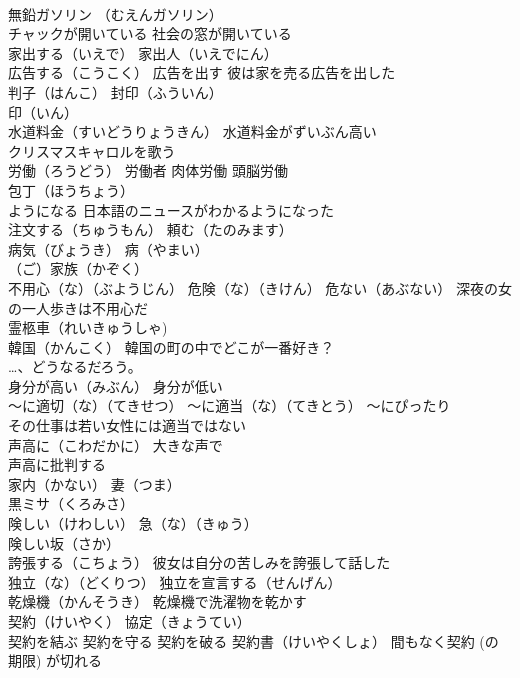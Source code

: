 \documentclass[8pt]{extreport}
\begin{document}
\begin{CJK}{UTF8}{min}
\\	無鉛ガソリン （むえんガソリン）
\\	チャックが開いている 社会の窓が開いている 
\\	家出する（いえで） 家出人（いえでにん）
\\	広告する（こうこく） 広告を出す 彼は家を売る広告を出した
\\	判子（はんこ） 封印（ふういん） 
\\	印（いん） 
\\	水道料金（すいどうりょうきん） 水道料金がずいぶん高い
\\	クリスマスキャロルを歌う
\\	労働（ろうどう） 労働者 肉体労働 頭脳労働
\\	包丁（ほうちょう）
\\	ようになる 日本語のニュースがわかるようになった
\\	注文する（ちゅうもん） 頼む（たのみます）
\\	病気（びょうき） 病（やまい）
\\	（ご）家族（かぞく）
\\	不用心（な）（ぶようじん） 危険（な）（きけん） 危ない（あぶない） 深夜の女の一人歩きは不用心だ
\\	霊柩車（れいきゅうしゃ)
\\	韓国（かんこく） 韓国の町の中でどこが一番好き？
\\	…、どうなるだろう。
\\	身分が高い（みぶん） 身分が低い
\\	～に適切（な）（てきせつ） ～に適当（な）（てきとう） ～にぴったり 
\\	その仕事は若い女性には適当ではない
\\	声高に（こわだかに） 大きな声で 
\\	声高に批判する
\\	家内（かない） 妻（つま）
\\	黒ミサ（くろみさ）
\\	険しい（けわしい） 急（な）（きゅう）
\\	険しい坂（さか）
\\	誇張する（こちょう） 彼女は自分の苦しみを誇張して話した
\\	独立（な）（どくりつ） 独立を宣言する（せんげん）
\\	乾燥機（かんそうき） 乾燥機で洗濯物を乾かす
\\	契約（けいやく） 協定（きょうてい）
\\	契約を結ぶ 契約を守る 契約を破る 契約書（けいやくしょ） 間もなく契約 (の期限) が切れる

\end{CJK}
\end{document}
